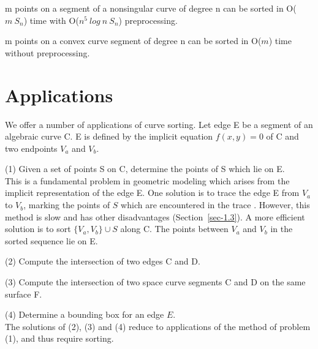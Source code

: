 \begin{corollary}
m points on a segment of a nonsingular curve of degree n can be sorted 
in O($m\ S_{n}$) time with O($n^5\ log\ n\ S_{n}$) preprocessing.
\end{corollary}

\begin{corollary}
m points on a convex curve segment of degree n can be sorted 
in O($m$) time without preprocessing.
\end{corollary}
%
\section{Applications}

\tab We offer a number of applications of curve sorting.
Let edge E be a segment of an algebraic curve C. 
E is defined by the implicit equation $f(x,y) = 0$ of C and
two endpoints $V_{a}$ and $V_{b}$.

(1) Given a set of points S on C, determine the points of S
which lie on E.\\
%
This is a fundamental problem in geometric modeling which arises
from the implicit representation of the edge E.
One solution is to trace the edge E from $V_{a}$ to $V_{b}$,
marking the points of $S$ which are encountered in the trace \cite{bhh}.
However, this method is slow and has other 
disadvantages (Section~\ref{sec-1.3}).
A more efficient solution is to sort $\{V_a,V_b\} \cup S$
along C. The points between $V_a$ and $V_b$ in the sorted sequence lie on E.

(2) Compute the intersection of two edges C and D.
	  
(3) Compute the intersection of two space curve segments C and D
    on the same surface F.

(4)  Determine a bounding box for an edge $E$.\\
The solutions of (2), (3)  and (4) reduce to applications of the 
method of problem (1), and thus require sorting.
%
%
%

